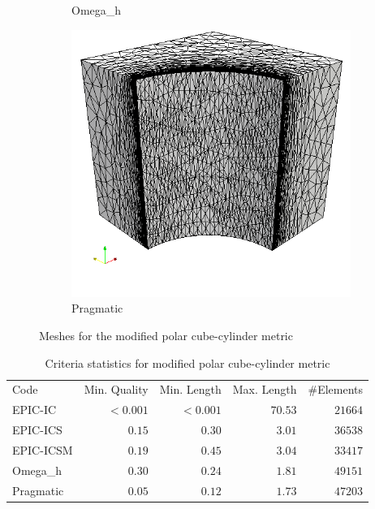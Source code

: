 \documentclass[3p,times,procedia,number]{elsarticle}
\begin{document}
\begin{figure}
\begin{subfigure}{.24\textwidth}
\caption{Omega\_h}
\end{subfigure}
\begin{subfigure}{.24\textwidth}
\centering
\includegraphics[width=\textwidth]{pragmatic-cube-cylinder-polar-2.png}
\caption{Pragmatic}
\end{subfigure}
\caption{Meshes for the modified polar cube-cylinder metric}
\label{fig:cube-cylinder-polar-2-meshes}
\end{figure}

\begin{table}
\caption{Criteria statistics for modified polar cube-cylinder metric}
\label{tab:polar-2-stats}
\begin{tabular}{lrrrr}
Code & Min. Quality & Min. Length & Max. Length & \#Elements\\
EPIC-IC    &$<0.001$&     $<0.001$&      $70.53$&    $21664$\\
EPIC-ICS   &$  0.15$&     $  0.30$&      $ 3.01$&    $36538$\\
EPIC-ICSM  &$  0.19$&     $  0.45$&      $ 3.04$&    $33417$\\
Omega\_h   &$  0.30$&     $  0.24$&      $ 1.81$&    $49151$\\
Pragmatic  &$  0.05$&     $  0.12$&      $ 1.73$&    $47203$\\
\end{tabular}
\end{table}
\end{document}
